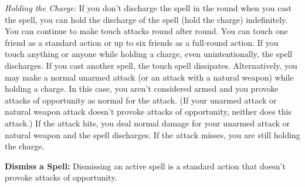 \textit{Holding the Charge:} If you don't discharge the spell in the round when you cast the spell, you can hold the discharge of the spell (hold the charge) indefinitely. You can continue to make touch attacks round after round. You can touch one friend as a standard action or up to six friends as a full-round action. If you touch anything or anyone while holding a charge, even unintentionally, the spell discharges. If you cast another spell, the touch spell dissipates. Alternatively, you may make a normal unarmed attack (or an attack with a natural weapon) while holding a charge. In this case, you aren't considered armed and you provoke attacks of opportunity as normal for the attack. (If your unarmed attack or natural weapon attack doesn't provoke attacks of opportunity, neither does this attack.) If the attack hits, you deal normal damage for your unarmed attack or natural weapon and the spell discharges. If the attack misses, you are still holding the charge.

\textbf{Dismiss a Spell:} Dismissing an active spell is a standard action that doesn't provoke attacks of opportunity.
